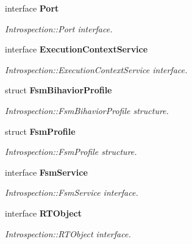 \begin{CompactItemize}
interface {\bf Port}
\begin{CompactList}\small\item\em Introspection::Port interface. \item\end{CompactList}\item 
interface {\bf Execution\-Context\-Service}
\begin{CompactList}\small\item\em Introspection::Execution\-Context\-Service interface. \item\end{CompactList}\item 
struct {\bf Fsm\-Bihavior\-Profile}
\begin{CompactList}\small\item\em Introspection::Fsm\-Bihavior\-Profile structure. \item\end{CompactList}\item 
struct {\bf Fsm\-Profile}
\begin{CompactList}\small\item\em Introspection::Fsm\-Profile structure. \item\end{CompactList}\item 
interface {\bf Fsm\-Service}
\begin{CompactList}\small\item\em Introspection::Fsm\-Service interface. \item\end{CompactList}\item 
interface {\bf RTObject}
\begin{CompactList}\small\item\em Introspection::RTObject interface. \item\end{CompactList}\end{CompactItemize}
